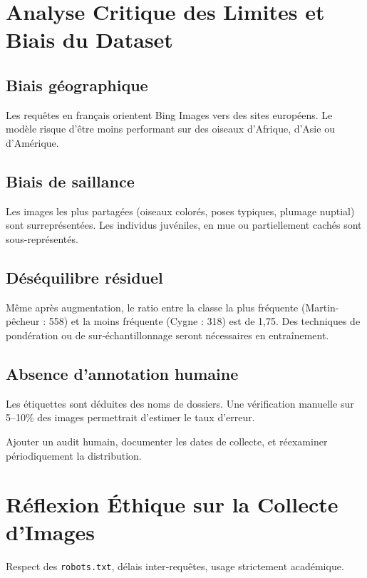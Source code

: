 \documentclass[12pt,a4paper]{article}
\begin{document}
\section{Analyse Critique des Limites et Biais du Dataset}
\subsection{Biais géographique}
Les requêtes en français orientent Bing Images vers des sites européens.  
Le modèle risque d'être moins performant sur des oiseaux d'Afrique, d'Asie ou d'Amérique.

\subsection{Biais de saillance}
Les images les plus partagées (oiseaux colorés, poses typiques, plumage nuptial) sont surreprésentées.  
Les individus juvéniles, en mue ou partiellement cachés sont sous-représentés.

\subsection{Déséquilibre résiduel}
Même après augmentation, le ratio entre la classe la plus fréquente (Martin-pêcheur : 558) et la moins fréquente (Cygne : 318) est de 1,75.  
Des techniques de pondération ou de sur‑échantillonnage seront nécessaires en entraînement.

\subsection{Absence d'annotation humaine}
Les étiquettes sont déduites des noms de dossiers. Une vérification manuelle sur 5–10\% des images permettrait d'estimer le taux d'erreur.

\begin{warnbox}[Recommandations]
Ajouter un audit humain, documenter les dates de collecte, et réexaminer périodiquement la distribution.
\end{warnbox}

\section{Réflexion Éthique sur la Collecte d'Images}
\begin{ethicbox}
Respect des \texttt{robots.txt}, délais inter‑requêtes, usage strictement académique.
\end{ethicbox}
\end{document}
